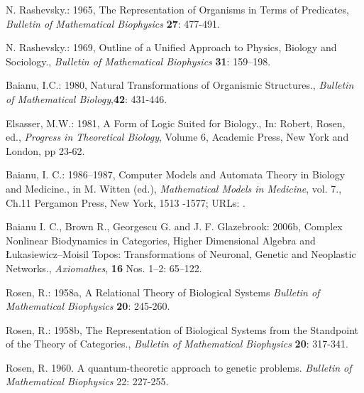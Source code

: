 \documentclass[12pt]{article}
\theoremstyle{plain}
\theoremstyle{definition}
\numberwithin{equation}{section}
\begin{document}
\begin{thebibliography}{99}

N. Rashevsky.: 1965, The Representation of Organisms in Terms of Predicates, \emph{Bulletin of Mathematical Biophysics} \textbf{27}: 477-491.

N. Rashevsky.: 1969, Outline of a Unified Approach to Physics, Biology and Sociology., \emph{Bulletin of Mathematical Biophysics} \textbf{31}: 159--198.

Baianu, I.C.: 1980, Natural Transformations of Organismic Structures.,
\emph{Bulletin of Mathematical Biology},\textbf{42}: 431-446.

Elsasser, M.W.: 1981, A Form of Logic Suited for Biology., In: Robert, Rosen, ed., \emph{Progress in Theoretical Biology},  Volume 6, Academic Press, New York and London, pp 23-62.

Baianu, I. C.: 1986--1987, Computer Models and Automata Theory in Biology and Medicine.,  in M. Witten (ed.), \emph{Mathematical Models in Medicine}, vol. 7., Ch.11 Pergamon Press, New York, 1513 -1577; URLs: .

Baianu I. C., Brown R., Georgescu G. and J. F. Glazebrook: 2006b, Complex Nonlinear Biodynamics in Categories, Higher Dimensional Algebra and \L ukasiewicz--Moisil Topos: Transformations of Neuronal, Genetic and Neoplastic Networks., \emph{Axiomathes}, \textbf{16} Nos. 1--2: 65--122.


Rosen, R.: 1958a, A Relational Theory of Biological Systems \emph{Bulletin of Mathematical Biophysics} 
\textbf{20}: 245-260.

Rosen, R.: 1958b, The Representation of Biological Systems from the Standpoint of the 
Theory of Categories., \emph{ Bulletin of Mathematical Biophysics} \textbf{20}: 317-341.

Rosen, R. 1960. A quantum-theoretic approach to genetic problems. \emph{Bulletin of Mathematical Biophysics} 
22: 227-255.

\end{thebibliography}



 

\end{document}
